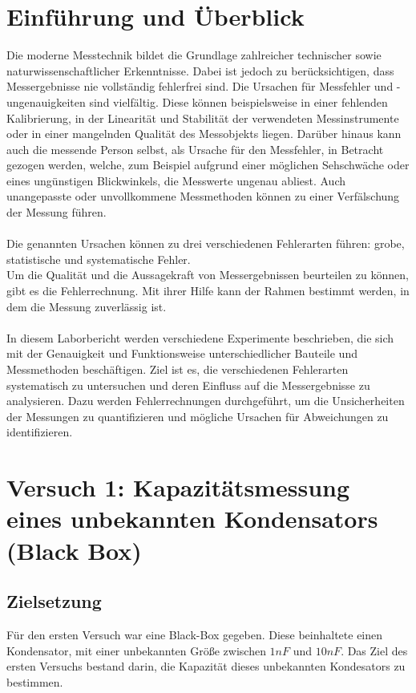 \documentclass[a4paper,12pt]{article}
\begin{document}
\section*{Einführung und Überblick}
Die moderne Messtechnik bildet die Grundlage zahlreicher technischer sowie naturwissenschaftlicher Erkenntnisse. Dabei ist jedoch zu berücksichtigen, dass Messergebnisse nie vollständig fehlerfrei sind. Die Ursachen für Messfehler und -ungenauigkeiten sind vielfältig. Diese können beispielsweise in einer fehlenden Kalibrierung, in der Linearität und Stabilität der verwendeten Messinstrumente oder in einer mangelnden Qualität des Messobjekts liegen. Darüber hinaus kann auch die messende Person selbst, als Ursache für den Messfehler, in Betracht gezogen werden, welche, zum Beispiel aufgrund einer möglichen Sehschwäche oder eines ungünstigen Blickwinkels, die Messwerte ungenau abliest. Auch unangepasste oder unvollkommene Messmethoden können zu einer Verfälschung der Messung führen.\\\\
Die genannten Ursachen können zu drei verschiedenen Fehlerarten führen: grobe, statistische und systematische Fehler.\\
Um die Qualität und die Aussagekraft von Messergebnissen beurteilen zu können, gibt es die Fehlerrechnung. Mit ihrer Hilfe kann der Rahmen bestimmt werden, in dem die Messung zuverlässig ist.\\\\
\noindent In diesem Laborbericht werden verschiedene Experimente beschrieben, die sich mit der Genauigkeit und Funktionsweise unterschiedlicher Bauteile und Messmethoden beschäftigen. Ziel ist es, die verschiedenen Fehlerarten systematisch zu untersuchen und deren Einfluss auf die Messergebnisse zu analysieren. Dazu werden Fehlerrechnungen durchgeführt, um die Unsicherheiten der Messungen zu quantifizieren und mögliche Ursachen für Abweichungen zu identifizieren.


\newpage

\section{Versuch 1: Kapazitätsmessung eines unbekannten Kondensators (Black Box)}

\subsection{Zielsetzung}
Für den ersten Versuch war eine Black-Box gegeben. Diese beinhaltete einen Kondensator, mit einer unbekannten Größe zwischen $1 nF$ und $10 nF$. Das Ziel des ersten Versuchs bestand darin, die Kapazität dieses unbekannten Kondesators zu bestimmen. 
\end{document}
